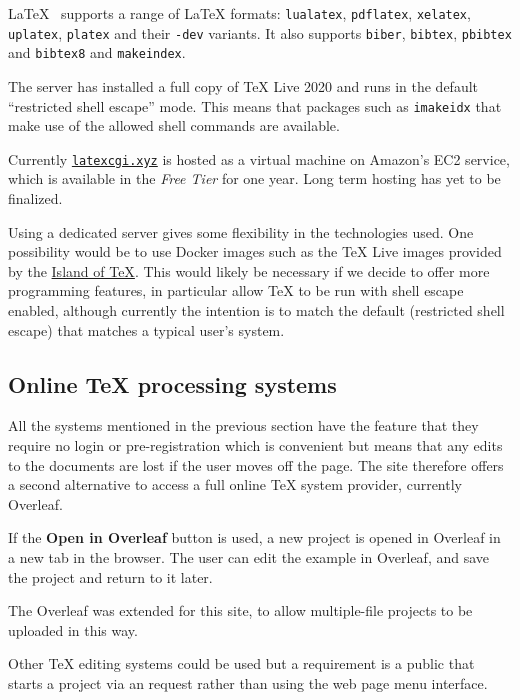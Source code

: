 \documentclass[harvardcite]{ltugboat}
\begin{document}
\LaTeX{}~ supports a range of \LaTeX{} formats:
\texttt{lualatex}, \texttt{pdflatex}, \texttt{xelatex},
\texttt{uplatex}, \texttt{platex} and their \texttt{-dev} variants. It also
supports \texttt{biber}, \texttt{bibtex}, \texttt{pbibtex} and \texttt{bibtex8} and \texttt{makeindex}.

The server has installed a full copy of \TeX{} Live 2020 and runs in
the default \enquote{restricted shell escape} mode. This means that packages
 such as \texttt{imakeidx} that make use of the allowed shell commands
are available.

Currently \href{https://latexcgi.xyz}{\nolinkurl{latexcgi.xyz}} is hosted as a virtual machine on
Amazon's EC2 service, which is available in the \emph{Free Tier} for one
year. Long term hosting has yet to be finalized.

Using a dedicated server gives some flexibility in the technologies
used.  One possibility would be to use Docker images such as the
\TeX{} Live images provided by the
\href{https://gitlab.com/islandoftex/images}{Island of \TeX{}}.  This
would likely be necessary if we decide to offer more programming
features, in particular allow \TeX{} to be run with shell escape
enabled, although currently the intention is to match the default
(restricted shell escape) that matches a typical user's system.

\subsection{Online \TeX{} processing systems}

All the systems mentioned in the previous section have the feature that
they require no login or pre-registration which is convenient but
means that any edits to the documents are lost if the user moves off
the page.  The site therefore offers a second alternative to access a
full online \TeX{} system provider, currently Overleaf.

If the \textbf{Open in Overleaf} button is used, a new project is
opened in Overleaf in a new tab in the browser. The user can edit the
example in Overleaf, and save the project and return to it later.

The Overleaf  was extended for this site, to allow multiple-file
projects to be uploaded in this way.

Other \TeX{} editing systems could be used but a requirement is a
public  that starts a project via an  request rather than using
the web page menu interface.
\end{document}

